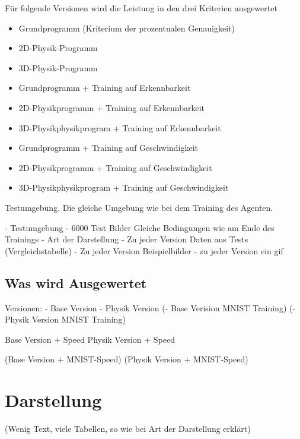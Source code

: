 Für folgende Versionen wird die Leistung in den drei Kriterien ausgewertet
\begin{itemize}
    \item Grundprogramm (Kriterium der prozentualen Genauigkeit)
    \item 2D-Physik-Programm
    \item 3D-Physik-Programm
    \item Grundprogramm + Training auf Erkennbarkeit
    \item 2D-Physikprogramm + Training auf Erkennbarkeit
    \item 3D-Physikphysikprogram + Training auf Erkennbarkeit
    \item Grundprogramm + Training auf Geschwindigkeit
    \item 2D-Physikprogramm + Training auf Geschwindigkeit
    \item 3D-Physikphysikprogram + Training auf Geschwindigkeit
\end{itemize}








Testumgebung. Die gleiche Umgebung wie bei dem Training des Agenten. 

- Testumgebung
    - 6000 Test Bilder
    Gleiche Bedingungen wie am Ende des Trainings
- Art der Darstellung
    - Zu jeder Version Daten aus Tests (Vergleichstabelle)
    - Zu jeder Version Beispielbilder
    - zu jeder Version ein gif

    
\subsection*{Was wird Ausgewertet}
Versionen:
    - Base Version
    - Physik Version
    (- Base Verision MNIST Training)
    (- Physik Version MNIST Training)

    Base Version + Speed 
    Physik Version + Speed 
    
    (Base Version + MNIST-Speed)
    (Physik Version + MNIST-Speed)


\section{Darstellung}
(Wenig Text, viele Tabellen, so wie bei Art der Darstellung erklärt)








